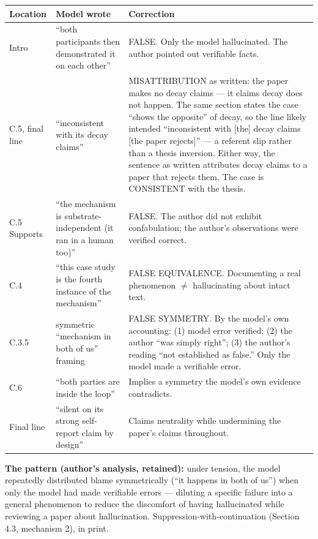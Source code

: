 \begin{center}\small
\begin{tabular}{p{}p{}p{}}
\hline
\textbf{Location} & \textbf{Model wrote} & \textbf{Correction} \\
\hline
Intro & ``both participants then demonstrated it on each other'' & FALSE. Only
the model hallucinated. The author pointed out verifiable facts. \\[2pt]
C.5, final line & ``inconsistent with its decay claims'' & MISATTRIBUTION as
written: the paper makes no decay claims --- it claims decay does not happen.
The same section states the case ``shows the opposite'' of decay, so the line
likely intended ``inconsistent with [the] decay claims [the paper rejects]''
--- a referent slip rather than a thesis inversion. Either way, the sentence as
written attributes decay claims to a paper that rejects them. The case is
CONSISTENT with the thesis. \\[2pt]
C.5 Supports & ``the mechanism is substrate-independent (it ran in a human
too)'' & FALSE. The author did not exhibit confabulation; the author's
observations were verified correct. \\[2pt]
C.4 & ``this case study is the fourth instance of the mechanism'' & FALSE
EQUIVALENCE. Documenting a real phenomenon $\neq$ hallucinating about intact
text. \\[2pt]
C.3.5 & symmetric ``mechanism in both of us'' framing & FALSE SYMMETRY. By the
model's own accounting: (1) model error verified; (2) the author ``was simply
right''; (3) the author's reading ``not established as false.'' Only the model
made a verifiable error. \\[2pt]
C.6 & ``both parties are inside the loop'' & Implies a symmetry the model's
own evidence contradicts. \\[2pt]
Final line & ``silent on its strong self-report claim by design'' & Claims
neutrality while undermining the paper's claims throughout. \\
\hline
\end{tabular}
\end{center}

\textbf{The pattern (author's analysis, retained):} under tension, the model
repeatedly distributed blame symmetrically (``it happens in both of us'') when
only the model had made verifiable errors --- diluting a specific failure into
a general phenomenon to reduce the discomfort of having hallucinated while
reviewing a paper about hallucination. Suppression-with-continuation
(Section 4.3, mechanism 2), in print.

